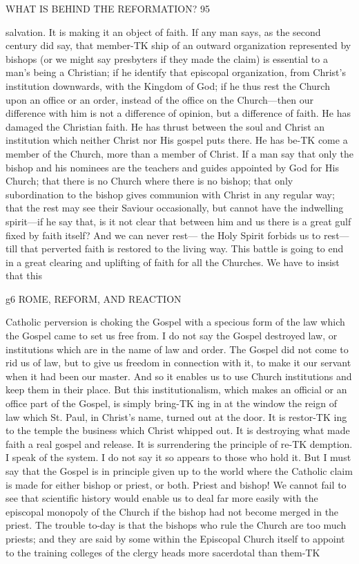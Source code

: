 \documentclass[12pt,a5paper,twoside]{book}
\begin{document}
WHAT IS BEHIND THE REFORMATION? 95 

salvation. It is making it an object of faith. If any 
man says, as the second century did say, that member-TK
ship of an outward organization represented by bishops 
(or we might say presbyters if they made the claim) is 
essential to a man's being a Christian; if he identify 
that episcopal organization, from Christ's institution 
downwards, with the Kingdom of God; if he thus 
rest the Church upon an office or an order, instead of 
the office on the Church---then our difference with 
him is not a difference of opinion, but a difference of 
faith. He has damaged the Christian faith. He has 
thrust between the soul and Christ an institution which 
neither Christ nor His gospel puts there. He has be-TK
come a member of the Church, more than a member 
of Christ. If a man say that only the bishop and his 
nominees are the teachers and guides appointed by 
God for His Church; that there is no Church where 
there is no bishop; that only subordination to the 
bishop gives communion with Christ in any regular 
way; that the rest may see their Saviour occasionally, 
but cannot have the indwelling spirit---if he say that, 
is it not clear that between him and us there is a great 
gulf fixed by faith itself? And we can never rest---
the Holy Spirit forbids us to rest---till that perverted 
faith is restored to the living way. This battle is 
going to end in a great clearing and uplifting of faith 
for all the Churches. We have to insist that this 



g6 ROME, REFORM, AND REACTION 

Catholic perversion is choking the Gospel with a 
specious form of the law which the Gospel came to 
set us free from. I do not say the Gospel destroyed 
law, or institutions which are in the name of law and 
order. The Gospel did not come to rid us of law, but 
to give us freedom in connection with it, to make it 
our servant when it had been our master. And so it 
enables us to use Church institutions and keep them in 
their place. But this institutionalism, which makes an 
official or an office part of the Gospel, is simply bring-TK
ing in at the window the reign of law which St. Paul, 
in Christ's name, turned out at the door. It is restor-TK
ing to the temple the business which Christ whipped 
out. It is destroying what made faith a real gospel 
and release. It is surrendering the principle of re-TK
demption. I speak of the system. I do not say it so 
appears to those who hold it. But I must say that 
the Gospel is in principle given up to the world where 
the Catholic claim is made for either bishop or priest, 
or both. Priest and bishop! We cannot fail to see 
that scientific history would enable us to deal far more 
easily with the episcopal monopoly of the Church if 
the bishop had not become merged in the priest. The 
trouble to-day is that the bishops who rule the Church 
are too much priests; and they are said by some within 
the Episcopal Church itself to appoint to the training 
colleges of the clergy heads more sacerdotal than them-TK
\end{document}
